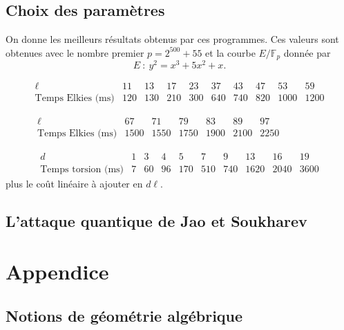 \documentclass[11pt,a4paper]{article}
\newcommand{\F}{\mathbb{F}}
\theoremstyle{definition}
\begin{document}
\subsection{Choix des paramètres}

On donne les meilleurs résultats obtenus par ces programmes. Ces valeurs sont obtenues avec le nombre premier $ p = 2^{500} + 55$ et la courbe $E/\F_p$ donnée par
$$E\ :\ y^2 = x^3 + 5x^2 + x.$$

$$\begin{matrix}
\ell & 11 & 13 & 17 & 23 & 37 & 43 & 47 & 53 & 59 \\
\text{Temps\ Elkies\ (ms)} & 120 & 130 & 210 & 300 & 640 & 740 & 820 & 1000 & 1200 
\end{matrix}$$

$$\begin{matrix}
\ell & 67 & 71 & 79 & 83 & 89 & 97 &\qquad & &\\
\text{Temps\ Elkies\ (ms)} & 1500 & 1550 & 1750 & 1900 & 2100 & 2250 & & &
\end{matrix}$$

$$\begin{matrix}
d & 1 & 3 & 4 & 5 & 7 & 9 & 13 & 16 & 19\\
\text{Temps\ torsion\ (ms)} & 7 & 60 & 96 & 170 & 510 & 740 & 1620 & 2040 & 3600
\end{matrix}$$
plus le coût linéaire à ajouter en $d\ell$.
\newpage

\subsection{L'attaque quantique de Jao et Soukharev}

\section{Appendice}

\subsection{Notions de géométrie algébrique}



\newpage

\nocite{*}




\end{document}
